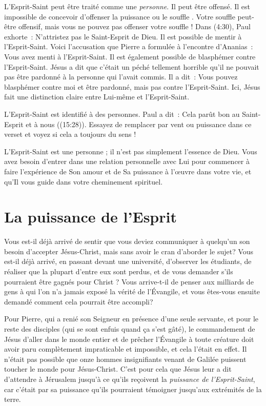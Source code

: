 L'Esprit-Saint peut être traité comme une \emph{personne}. Il peut être offensé.
 Il est impossible de concevoir d'offenser \Og la puissance \Fg{} ou
 \Og le souffle \Fg{}. Votre souffle peut-être offensif, mais vous ne pouvez
 pas offenser votre souffle ! Dans (4:30), Paul exhorte~:
 \Og N'attristez pas le Saint-Esprit de Dieu. \Fg{}
 Il est possible de mentir à l'Esprit-Saint. Voici l'accusation que Pierre a
 formulée à l'encontre d'Ananias~:
 \Og Vous avez menti à l'Esprit-Saint. \Fg{}
 Il est également possible de blasphémer contre l'Esprit-Saint.
 Jésus a dit que c'était un péché tellement horrible qu'il ne pouvait pas
 être pardonné à la personne qui l'avait commis. Il a dit~:
 \Og Vous pouvez blasphémer contre moi et être pardonné, mais pas contre
 l'Esprit-Saint. \Fg{}
 Ici, Jésus fait une distinction claire entre Lui-même et l'Esprit-Saint.

L'Esprit-Saint est identifié à des personnes. Paul a dit~:
 \Og Cela parût bon au Saint-Esprit et à nous \Fg{}
 ((15:28)).
 Essayez de remplacer par vent ou puissance dans ce verset et voyez si cela
 a toujours du sens !

L'Esprit-Saint est une personne ; il n'est pas simplement l'essence de Dieu.
 Vous avez besoin d'entrer dans une relation personnelle avec Lui pour
 commencer à faire l'expérience de Son amour et de Sa puissance à l'œuvre
 dans votre vie, et qu'Il vous guide dans votre cheminement spirituel.


\section{La puissance de l'Esprit}

Vous est-il déjà arrivé de sentir que vous deviez communiquer à quelqu'un
son besoin d'accepter Jésus-Christ, mais sans avoir le cran d'aborder le sujet?
 Vous est-il déjà arrivé, en passant devant une université,
 d'observer les étudiants, de réaliser que la plupart d'entre eux sont perdus,
 et de vous demander s'ils pourraient être gagnés pour Christ ?
 Vous arrive-t-il de penser aux milliards de gens à qui l'on n'a jamais
 exposé la vérité de l'Évangile, et vous êtes-vous ensuite demandé
 comment cela pourrait être accompli?

Pour Pierre, qui a renié son Seigneur en présence d'une seule servante,
 et pour le reste des disciples (qui se sont enfuis quand ça s'est gâté),
 le commandement de Jésus d'aller dans le monde entier et de prêcher
 l'Évangile à toute créature doit avoir paru complètement impraticable et
 impossible, et cela l'était en effet.
 Il n'était pas possible que onze hommes insignifiants venant de Galilée
 puissent toucher le monde pour Jésus-Christ.
 C'est pour cela que Jésus leur a dit d'attendre à Jérusalem jusqu'à ce
 qu'ils reçoivent la \emph{puissance de l'Esprit-Saint}, car c'était par
 sa puissance qu'ils pourraient témoigner jusqu'aux extrémités de la terre.

